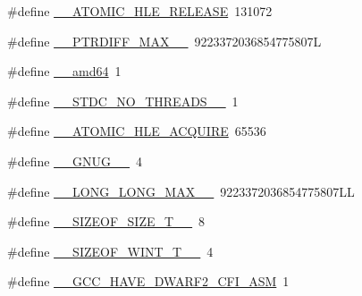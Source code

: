 \begin{DoxyCompactItemize}
\item 
\#define \hyperlink{build-analizer__host-_desktop___qt__5__9__0___g_c_c__64bit-_release_2moc__predefs_8h_a6bb8315e719b7306f47cde3b4b30d91f}{\+\_\+\+\_\+\+A\+T\+O\+M\+I\+C\+\_\+\+H\+L\+E\+\_\+\+R\+E\+L\+E\+A\+S\+E}~131072
\item 
\#define \hyperlink{build-analizer__host-_desktop___qt__5__9__0___g_c_c__64bit-_release_2moc__predefs_8h_ac29c76a6702808cfc4a5f661d0d33c2c}{\+\_\+\+\_\+\+P\+T\+R\+D\+I\+F\+F\+\_\+\+M\+A\+X\+\_\+\+\_\+}~9223372036854775807\+L
\item 
\#define \hyperlink{build-analizer__host-_desktop___qt__5__9__0___g_c_c__64bit-_release_2moc__predefs_8h_ac78e83c300ae463c501bbe70c5a2a8c7}{\+\_\+\+\_\+amd64}~1
\item 
\#define \hyperlink{build-analizer__host-_desktop___qt__5__9__0___g_c_c__64bit-_release_2moc__predefs_8h_a80dc30fae2c51e5db5b4f5eb7400cd1a}{\+\_\+\+\_\+\+S\+T\+D\+C\+\_\+\+N\+O\+\_\+\+T\+H\+R\+E\+A\+D\+S\+\_\+\+\_\+}~1
\item 
\#define \hyperlink{build-analizer__host-_desktop___qt__5__9__0___g_c_c__64bit-_release_2moc__predefs_8h_ac227f24525ec0825a758b2eb0869dc8f}{\+\_\+\+\_\+\+A\+T\+O\+M\+I\+C\+\_\+\+H\+L\+E\+\_\+\+A\+C\+Q\+U\+I\+R\+E}~65536
\item 
\#define \hyperlink{build-analizer__host-_desktop___qt__5__9__0___g_c_c__64bit-_release_2moc__predefs_8h_ae7afb460abc6122c6a5f206d78bcae4e}{\+\_\+\+\_\+\+G\+N\+U\+G\+\_\+\+\_\+}~4
\item 
\#define \hyperlink{build-analizer__host-_desktop___qt__5__9__0___g_c_c__64bit-_release_2moc__predefs_8h_a9bed0d0b1893211f857ad76d6728ea7e}{\+\_\+\+\_\+\+L\+O\+N\+G\+\_\+\+L\+O\+N\+G\+\_\+\+M\+A\+X\+\_\+\+\_\+}~9223372036854775807\+L\+L
\item 
\#define \hyperlink{build-analizer__host-_desktop___qt__5__9__0___g_c_c__64bit-_release_2moc__predefs_8h_ab6eb3d66486ef05ac7f1d489bfc675b4}{\+\_\+\+\_\+\+S\+I\+Z\+E\+O\+F\+\_\+\+S\+I\+Z\+E\+\_\+\+T\+\_\+\+\_\+}~8
\item 
\#define \hyperlink{build-analizer__host-_desktop___qt__5__9__0___g_c_c__64bit-_release_2moc__predefs_8h_a808f04c28bb0ef2d6b77dd66564ad351}{\+\_\+\+\_\+\+S\+I\+Z\+E\+O\+F\+\_\+\+W\+I\+N\+T\+\_\+\+T\+\_\+\+\_\+}~4
\item 
\#define \hyperlink{build-analizer__host-_desktop___qt__5__9__0___g_c_c__64bit-_release_2moc__predefs_8h_a89cfc45cff96747b74ae03bdb2310814}{\+\_\+\+\_\+\+G\+C\+C\+\_\+\+H\+A\+V\+E\+\_\+\+D\+W\+A\+R\+F2\+\_\+\+C\+F\+I\+\_\+\+A\+S\+M}~1
\item 

\end{DoxyCompactItemize}
